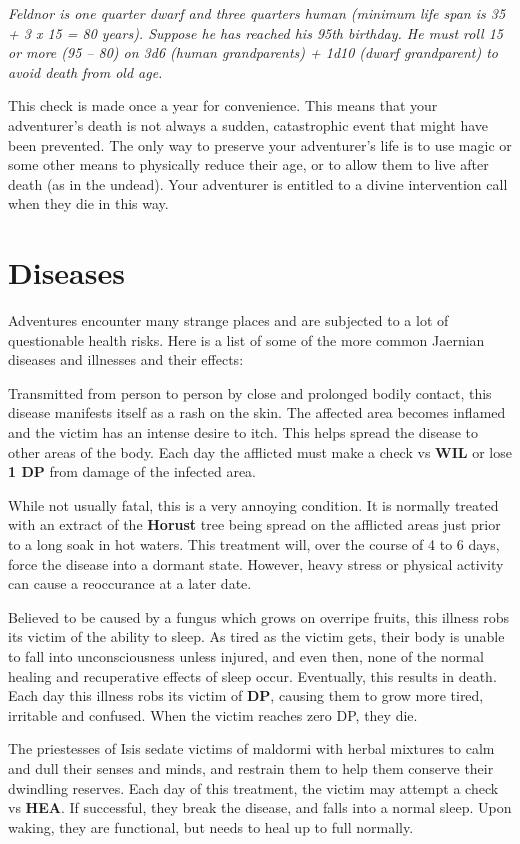 \begin{multicols*}{2}
\textit{Feldnor is one quarter dwarf and three quarters human (minimum life span is 35 + 3 x 15 = 80 years). Suppose he has reached his 95th birthday. He must roll 15 or more (95 – 80) on 3d6 (human grandparents) + 1d10 (dwarf grandparent) to avoid death from old age.}

This check is made once a year for convenience. This means that your adventurer's death is not always a sudden, catastrophic event that might have been prevented. The only way to preserve your adventurer's life is to use magic or some other means to physically reduce their age, or to allow them to live after death (as in the undead). Your adventurer is entitled to a divine intervention call when they die in this way.
\section{Diseases}
Adventures encounter many strange places and are subjected to a lot of questionable health risks. Here is a list of some of the more common Jaernian diseases and illnesses and their effects:

 Transmitted from person to person by close and prolonged bodily contact, this disease manifests itself as a rash on the skin. The affected area becomes inflamed and the victim has an intense desire to itch. This helps spread the disease to other areas of the body. Each day the afflicted must make a  check vs \textbf{WIL} or lose \textbf{1 DP} from damage of the infected area. 

While not usually fatal, this is a very annoying condition. It is normally treated with an extract of the \textbf{Horust} tree being spread on the afflicted areas just prior to a long soak in hot waters. This treatment will, over the course of 4 to 6 days, force the disease into a dormant state. However, heavy stress or physical activity can cause a reoccurance at a later date.

 Believed to be caused by a fungus which grows on overripe fruits, this illness robs its victim of the ability to sleep. As tired as the victim gets, their body is unable to fall into unconsciousness unless injured, and even then, none of the normal healing and recuperative effects of sleep occur. Eventually, this results in death. Each day this illness robs its victim of  \textbf{DP}, causing them to grow more tired, irritable and confused. When the victim reaches zero DP, they die.

The priestesses of Isis sedate victims of maldormi with herbal mixtures to calm and dull their senses and minds, and restrain them to help them conserve their dwindling reserves. Each day of this treatment, the victim may attempt a  check vs \textbf{HEA}. If successful, they break the disease, and falls into a normal sleep. Upon waking, they are functional, but needs to heal up to full normally.


\end{multicols*}
